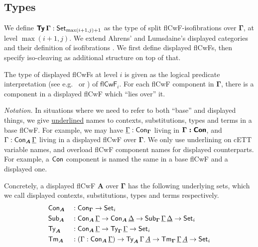 \documentclass[sigplan,review,anonymous]{acmart}\settopmatter{printfolios=true,printccs=false,printacmref=false}
\newcommand{\flCwF}{\mathsf{flCwF}}
\newcommand{\bGamma}{\boldsymbol{\Gamma}}
\newcommand{\bA}{\boldsymbol{A}}
\newcommand{\ul}[1]{\underline{#1}}
\newcommand{\ulGamma}{\ul{\Gamma}}
\newcommand{\ulDelta}{\ul{\Delta}}
\newcommand{\ulA}{\ul{A}}
\begin{document}
\subsection{Types}

We define $\boldsymbol{\mathsf{Ty}\,\Gamma} : \mathsf{Set}_{\max(i+1, j)+1}$ as the type of
split flCwF-isofibrations over $\bGamma$, at level $\max(i+1, j)$. We extend
Ahrens' and Lumsdaine's displayed categories and their definition of
isofibrations \cite{displayedcats}.  We first define displayed flCwFs, then
specify iso-cleaving as additional structure on top of that.

\begin{definition} The type of displayed flCwFs at level $i$ is given as the logical predicate interpretation (see e.g.\ \cite{bernardy12parametricity} or \cite{hiit}) of $\flCwF_i$. For each flCwF component in $\bGamma$, there is a component in a displayed flCwF which ``lies over'' it.

\emph{Notation.} In situations where we need to refer to both ``base'' and
displayed things, we give \ul{underlined} names to contexts, substitutions,
types and terms in a base flCwF. For example, we may have $\ulGamma :
\Con_{\bGamma}$ living in $\boldsymbol{\Gamma : \mathsf{Con}}$, and $\Gamma :
\Con_{\bA}\,\ulGamma$ living in a displayed flCwF over $\bGamma$. We only use
underlining on cETT variable names, and overload flCwF component names for
displayed counterparts. For example, a $\mathsf{Con}$ component is named the same in
a base flCwF and a displayed one.

Concretely, a displayed flCwF $\bA$ over $\bGamma$ has the following underlying sets, which we call displayed contexts, substitutions, types and terms respectively.
\begin{alignat*}{3}
  & \Con_{\bA} && : \Con_{\bGamma}\ra \Set_i\\
  & \Sub_{\bA} && : \Con_{\bA}\,\ulGamma \ra \Con_{\bA}\,\ulDelta \ra \Sub_{\bGamma}\,\ulGamma\,\ulDelta \ra \Set_i \\
  & \Ty_{\bA}  && : \Con_{\bA}\,\ulGamma \ra \Ty_{\bGamma}\,\ulGamma \ra \Set_i\\
  & \Tm_{\bA}  && : (\Gamma : \Con_{\bA}\,\ulGamma)\ra \Ty_{\bA}\,\Gamma\,\ulA \ra \Tm_{\bGamma}\,\ulGamma\,\ulA \ra \Set_i
\end{alignat*}


\end{definition}
\end{document}
